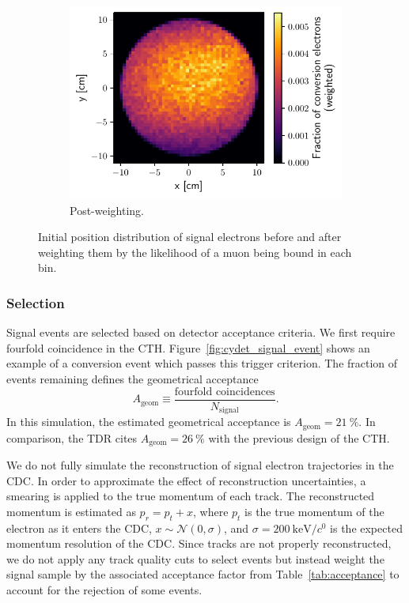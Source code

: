 \begin{figure}
\begin{subfigure}[t]{0.329\textwidth}
        \centering
        \includegraphics[width=\textwidth]{chapter6/weighted_conversion_position_distribution.pdf}
        \caption{Post-weighting.}
    \end{subfigure}
    \caption{ Initial position distribution of signal electrons before and after
        weighting them by the likelihood of a muon being bound in each bin. }
    \label{fig:stopping_position_reweighting}
\end{figure}


\subsubsection{Selection}
Signal events are selected based on detector acceptance criteria. We first
require fourfold coincidence in the CTH. Figure~\ref{fig:cydet_signal_event}
shows an example of a conversion event which passes this trigger criterion. The
fraction of events remaining defines the geometrical acceptance 
\begin{equation}
A_\mathrm{geom} \equiv  \frac{\text{fourfold coincidences}}{N_\mathrm{signal}}.
\end{equation}
In this simulation, the estimated geometrical acceptance is $A_\mathrm{geom} =
\SI{21}{\percent}$. In comparison, the TDR cites $A_\mathrm{geom} =
\SI{26}{\percent}$ with the previous design of the CTH.


We do not fully simulate the reconstruction of signal electron trajectories in
the CDC. In order to approximate the effect of reconstruction uncertainties, a
smearing is applied to the true momentum of each track. The reconstructed
momentum is estimated as $p_r = p_t + x$, where $p_t$ is the true momentum of
the electron as it enters the CDC, $x \sim \mathcal{N}(0, \sigma)$, and $\sigma
= \SI{200}{\keV/\clight}$ is the expected momentum resolution of the CDC. Since
tracks are not properly reconstructed, we do not apply any track quality cuts to
select events but instead weight the signal sample by the associated acceptance
factor from Table~\ref{tab:acceptance} to account for the rejection of some
events.

